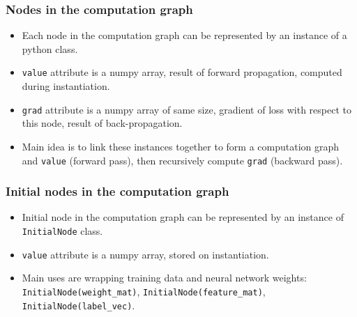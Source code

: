 \documentclass{beamer}
\begin{document}
\begin{frame}
  \frametitle{Nodes in the computation graph}
  \begin{itemize}
  \item Each node in the computation graph can be represented by an
    instance of a python class.
  \item \texttt{value} attribute is a numpy array, result of forward
    propagation, computed during instantiation.
  \item \texttt{grad} attribute is a numpy array of same size,
    gradient of loss with respect to this node, result of
    back-propagation. 
  \item Main idea is to link these instances together to form a
    computation graph and \texttt{value} (forward pass),
    then recursively compute \texttt{grad} (backward pass).
  \end{itemize}
\end{frame}

\begin{frame}
  \frametitle{Initial nodes in the computation graph}
  \begin{itemize}
  \item Initial node in the computation graph can be represented by an
    instance of \texttt{InitialNode} class.
  \item \texttt{value} attribute is a numpy array, 
    stored on instantiation.
  \item Main uses are wrapping training data and neural network
    weights: \texttt{InitialNode(weight\_mat)},
    \texttt{InitialNode(feature\_mat)},
    \texttt{InitialNode(label\_vec)}.
  \end{itemize}


\end{frame}
\end{document}
